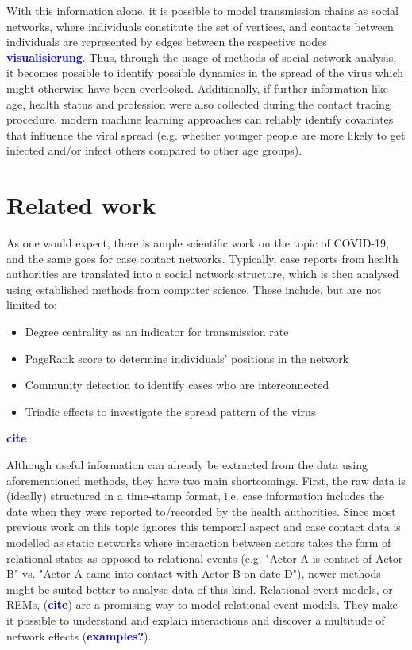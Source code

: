 \documentclass{article}
\newcommand{\add}[1]{\textbf{\textcolor{blue}{#1}}}
\begin{document}
	With this information alone, it is possible to model transmission chains as social networks, where individuals constitute the set of vertices, and contacts between individuals are represented by edges between the respective nodes \add{visualisierung}. Thus, through the usage of methods of social network analysis, it becomes possible to identify possible dynamics in the spread of the virus which might otherwise have been overlooked. Additionally, if further information like age, health status and profession were also collected during the contact tracing procedure, modern machine learning approaches can reliably identify covariates that influence the viral spread (e.g. whether younger people are more likely to get infected and/or infect others compared to other age groups).
	
	\section{Related work}
	As one would expect, there is ample scientific work on the topic of COVID-19, and the same goes for case contact networks. Typically, case reports from health authorities are translated into a social network structure, which is then analysed using established methods from computer science. These include, but are not limited to:
	\begin{itemize}
		\item Degree centrality as an indicator for transmission rate
		\item PageRank score to determine individuals' positions in the network
		\item Community detection to identify cases who are interconnected
		\item Triadic effects to investigate the spread pattern of the virus
	\end{itemize}\add{cite}
	
	Although useful information can already be extracted from the data using aforementioned methods, they have two main shortcomings. First, the raw data is (ideally) structured in a time-stamp format, i.e. case information includes the date when they were reported to/recorded by the health authorities. Since most previous work on this topic ignores this temporal aspect and case contact data is modelled as static networks where interaction between actors takes the form of relational states as opposed to relational events (e.g. "Actor A is contact of Actor B" vs. "Actor A came into contact with Actor B on date D"), newer methods might be suited better to analyse data of this kind. Relational event models, or REMs, (\add{cite}) are a promising way to model relational event models. They make it possible to understand and explain interactions and discover a multitude of network effects (\add{examples?}). 
	
\end{document}
